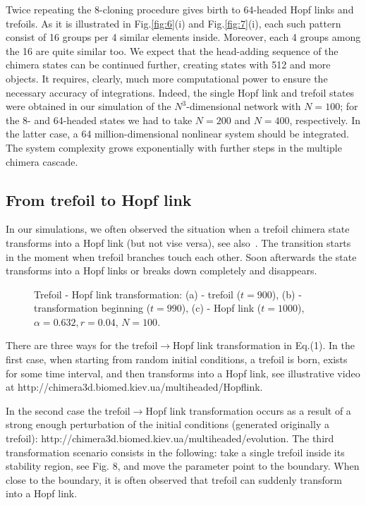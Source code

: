\documentclass[epjST]{svjour}
\begin{document}
Twice repeating the 8-cloning procedure gives birth to 64-headed Hopf links and trefoils.  As it is illustrated in Fig.\ref {fig:6}(i) and Fig.\ref{fig:7}(i), each such pattern consist of 16 groups per 4 similar elements inside. Moreover, each 4 groups among the  16 are quite similar too.  We expect that the head-adding sequence of the chimera states can be continued further, creating states with 512 and more objects.  It requires, clearly,  much more computational power to ensure the necessary accuracy of integrations.  Indeed, the  single Hopf link and trefoil states were obtained in our simulation of the $N^3$-dimensional network with $N=100$;  for the 8- and 64-headed states we had to take $N=200$  and  $N=400$, respectively.  In the latter case, a 64 million-dimensional nonlinear system should be integrated. The system complexity grows exponentially with further steps in the multiple chimera cascade.


 
\subsection{From trefoil to Hopf link}
\hspace*{0.5cm} In our simulations, we often observed the situation when a trefoil chimera state transforms into a Hopf link  (but not vise versa), see also~\cite{fm2000,ld2016}.  The transition starts in the moment when trefoil branches touch each other.  Soon afterwards the state transforms into a Hopf links or breaks down completely and disappears.

\begin{figure}[h]
\begin{center}
\end{center}
\caption{Trefoil - Hopf link transformation: (a) - trefoil ($t=900$), (b) -  transformation beginning ($t=990$), (c) - Hopf link ($t=1000$), $\alpha=0.632, r=0.04$,  $N = 100$. } 
\label{fig:11}
\end{figure}

There are three ways for the trefoil$\rightarrow$Hopf link transformation in Eq.(1). In the first case, when starting from random initial conditions, a trefoil is born,  exists for some time interval, and then transforms into a  Hopf link,  see illustrative video at http://chimera3d.biomed.kiev.ua/multiheaded/Hopflink. 

In the second case the trefoil$\rightarrow$Hopf link transformation occurs as a result of a strong enough perturbation of the initial conditions (generated originally a trefoil):
 http://chimera3d.biomed.kiev.ua/multiheaded/evolution.
  The  third  transformation scenario consists in the following:
take a single trefoil  inside its stability region, see Fig. 8, and move the  parameter point to the boundary. When close to the boundary,  it is often observed that trefoil can suddenly transform into a Hopf link. 
\end{document}
